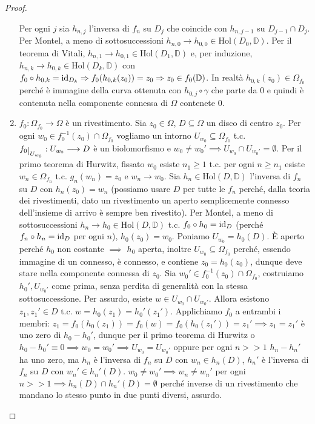 \begin{proof}
\begin{enumerate}
    Per ogni $j$ sia $h_{n, j}$ l'inversa di $f_n$ su $D_j$ che coincide con $h_{n, j-1}$ su $D_{j-1} \cap D_j$. Per Montel, a meno di sottosuccessioni $h_{n, 0} \longrightarrow h_{0, 0} \in \text{Hol}(D_0, \mathbb{D})$.
    Per il teorema di Vitali, $h_{n, 1} \longrightarrow h_{0, 1} \in \text{Hol}(D_1, \mathbb{D})$ e, per induzione, $h_{n, k} \longrightarrow h_{0, k} \in \text{Hol}(D_k, \mathbb{D})$ con $f_0 \circ h_{0, k}=\operatorname{id}_{D_k} \Rightarrow f_0(h_{0, k}(z_0))=z_0 \Rightarrow z_0 \in f_0(\mathbb{D})$.
    In realtà $h_{0, k}(z_0) \in \Omega_{f_0}$ perché è immagine della curva ottenuta con $h_{0, j} \circ \gamma$ che parte da $0$ e quindi è contenuta nella componente connessa di $\Omega$ contenete $0$.
    \item $f_0:\Omega_{f_0} \longrightarrow \Omega$ è un rivestimento. Sia $z_0 \in \Omega$, $D \subseteq \Omega$ un disco di centro $z_0$.
    Per ogni $w_0 \in f_0^{-1}(z_0) \cap \Omega_{f_0}$ vogliamo un intorno $U_{w_0} \subseteq \Omega_{f_0}$ t.c. $f_0\restrict{U_{w_0}}:U_{w_0} \longrightarrow D$ è un biolomorfismo e $w_0 \not=w_0' \implies U_{w_0}\cap U_{w_0'}=\emptyset$.
    Per il primo teorema di Hurwitz, fissato $w_0$ esiste $n_1 \ge 1$ t.c. per ogni $n \ge n_1$ esiste $w_n \in \Omega_{f_n}$ t.c. $g_n(w_n)=z_0$ e $w_n \longrightarrow w_0$. Sia $h_n \in \text{Hol}(D, \mathbb{D})$ l'inversa di $f_n$ su $D$ con $h_n(z_0)=w_n$ (possiamo usare $D$ per tutte le $f_n$ perché, dalla teoria dei rivestimenti, dato un rivestimento un aperto semplicemente connesso dell'insieme di arrivo è sempre ben rivestito).
    Per Montel, a meno di sottosuccessioni $h_n \longrightarrow h_0 \in \text{Hol}(D, \mathbb{D})$ t.c. $f_0 \circ h_0=\operatorname{id}_D$ (perché $f_n \circ h_n=\operatorname{id}_D$ per ogni $n$), $h_0(z_0)=w_0$.
    Poniamo $U_{w_0}=h_0(D)$. È aperto perché $h_0$ non costante $\implies$ $h_0$ aperta, inoltre $U_{w_0} \subseteq \Omega_{f_0}$ perché, essendo immagine di un connesso, è connesso, e contiene $z_0=h_0(z_0)$, dunque deve stare nella componente connessa di $z_0$. Sia $w_0' \in f_0^{-1}(z_0) \cap \Omega_{f_0}$, costruiamo $h_0', U_{w_0'}$ come prima, senza perdita di generalità con la stessa sottosuccessione.
    Per assurdo, esiste $w \in U_{w_0} \cap U_{w_0'}$. Allora esistono $z_1, z_1' \in D$ t.c. $w=h_0(z_1)=h_0'(z_1')$.
    Applichiamo $f_0$ a entrambi i membri: $z_1=f_0(h_0(z_1))=f_0(w)=f_0(h_0(z_1'))=z_1' \implies z_1=z_1'$ è uno zero di $h_0-h_0'$, dunque per il primo teorema di Hurwitz o $h_0-h_0' \equiv 0 \implies w_0=w_0' \implies U_{w_0}=U_{w_0'}$ oppure per ogni $n>>1$ $h_n-h_n'$ ha uno zero, ma $h_n$ è l'inversa di $f_n$ su $D$ con $w_n \in h_n(D)$, $h_n'$ è l'inversa di $f_n$ su $D$ con $w_n' \in h_n'(D)$.
    $w_0 \not=w_0' \implies w_n \not=w_n'$ per ogni $n>>1 \implies h_n(D)\cap h_n'(D)=\emptyset$ perché inverse di un rivestimento che mandano lo stesso punto in due punti diversi, assurdo.
  \end{enumerate}


\end{proof}
